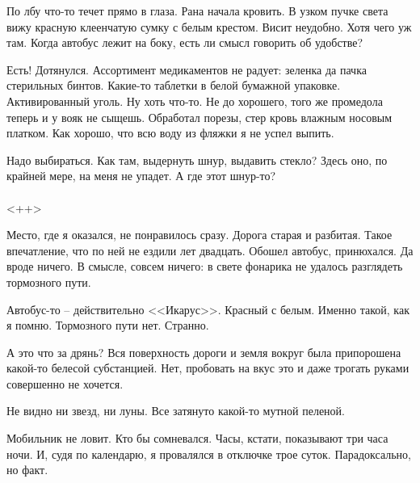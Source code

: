 \documentclass[a4paper]{book}
\begin{document}
По лбу что-то течет прямо в глаза. Рана начала кровить. В узком пучке света вижу красную клеенчатую сумку с белым крестом. Висит неудобно. Хотя чего уж там. Когда автобус лежит на боку, есть ли смысл говорить об удобстве? 

Есть! Дотянулся. Ассортимент медикаментов не радует: зеленка да пачка стерильных бинтов. Какие-то таблетки в белой бумажной упаковке. Активированный уголь. Ну хоть что-то. Не до хорошего, того же промедола теперь и у вояк не сыщешь. Обработал порезы, стер кровь влажным носовым платком. Как хорошо, что всю воду из фляжки я не успел выпить.

Надо выбираться. Как там, выдернуть шнур, выдавить стекло? Здесь оно, по крайней мере, на меня не упадет. А где этот шнур-то? 
\\
\paragraph{}<++>


Место, где я оказался, не понравилось сразу. Дорога старая и разбитая. Такое впечатление, что по ней не ездили лет двадцать. Обошел автобус, принюхался. Да вроде ничего. В смысле, совсем ничего: в свете фонарика не удалось разглядеть тормозного пути. 

Автобус-то -- действительно <<Икарус>>. Красный с белым. Именно такой, как я помню. Тормозного пути нет. Странно. 

А это что за дрянь? Вся поверхность дороги и земля вокруг была припорошена какой-то белесой субстанцией. Нет, пробовать на вкус это и даже трогать руками совершенно не хочется.

Не видно ни звезд, ни луны. Все затянуто какой-то мутной пеленой. 

Мобильник не ловит. Кто бы сомневался. Часы, кстати, показывают три часа ночи. И, судя по календарю, я провалялся в отключке трое суток. Парадоксально, но факт.
\end{document}

